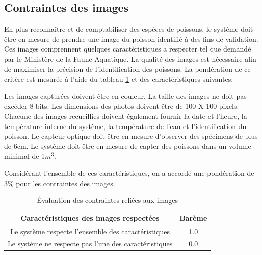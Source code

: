 \subsection{Contraintes des images}

En plus reconnaître et de comptabiliser des espèces de poissons, le système doit être en mesure de prendre une image du poisson identifié à des fins de validation. Ces images comprennent quelques caractéristiques a respecter tel que demandé par le Ministère de la Faune Aquatique. La qualité des images est nécessaire afin de maximiser la précision de l'identification des poissons. La pondération de ce critère est mesurée à l'aide du tableau \ref{t:bareme_contraintes_images} et des caractéristiques suivantes:

Les images capturées doivent être en couleur. La taille des images ne doit pas excéder 8 bits. Les dimensions des photos doivent être de 100 X 100 pixels. Chacune des images recueillies doivent également fournir la date et l'heure, la température interne du système, la température de l'eau et l'identification du poisson. Le capteur optique doit être en mesure d'observer des spécimens de plus de 6cm. Le système doit être en mesure de capter des poissons dans un volume minimal de 1$m^{3}$.



Considérant l'ensemble de ces caractéristiques, on a accordé une pondération de 3\% pour les contraintes des images.

\begin{table}[htp]
   \footnotesize
   \centering
   \begin{tabular}{|c|c|}
        \hline
        Caractéristiques des images respectées & Barème\\
        \hline
        \hline
        Le système respecte l'ensemble des caractéristiques & 1.0 \\
        \hline
        Le système ne respecte pas l'une des caractéristiques & 0.0 \\
        \hline
   \end{tabular}
   \caption{Évaluation des contraintes reliées aux images}
   \label{t:bareme_contraintes_images}
\end{table}

